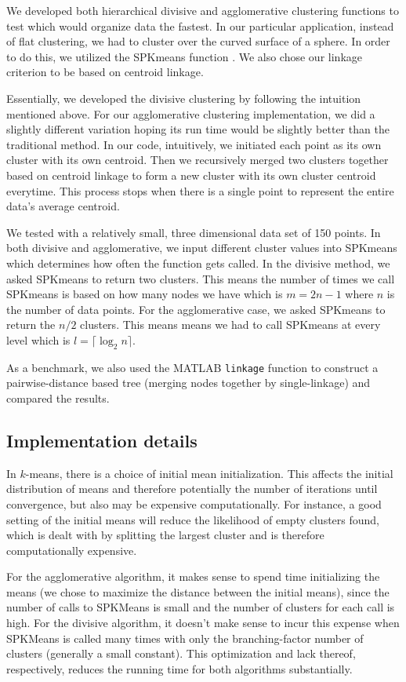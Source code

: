 \documentclass[../tech_report_1.tex]{subfiles}
\begin{document}
We developed both hierarchical divisive and agglomerative clustering
functions to test which would organize data the fastest.
In our particular
application, instead of flat clustering, we had to cluster over the
curved surface of a sphere. In order to do this, we utilized the SPKmeans
function \cite{nguyen_spherical_clustering}. We also chose our linkage criterion
to be based on centroid linkage.

Essentially, we developed the divisive clustering by following the
intuition mentioned above. For our agglomerative clustering implementation,
we did a slightly different variation hoping its run time would be
slightly better than the traditional method. In our code, intuitively,
we initiated each point as its own cluster with its own centroid.
Then we recursively merged two clusters together based on centroid
linkage to form a new cluster with its own cluster centroid everytime.
This process stops when there is a single point to represent the entire
data's average centroid.

We tested with a relatively small,
three dimensional data set of 150 points. In both 
divisive and agglomerative, we input different cluster values into
SPKmeans which determines how often the function gets called. In the
divisive method, we asked SPKmeans to return two clusters.
This means the number of times we call SPKmeans
is based on how many nodes we have which is $m=2n-1$ where $n$ is
the number of data points. For the agglomerative case, we asked SPKmeans to
return the $n/2$ clusters. This means means we had to call SPKmeans
at every level which is $l=\lceil\log_{2}n\rceil$.



As a benchmark, we also used the MATLAB \texttt{linkage} function to construct a pairwise-distance based tree (merging nodes together by single-linkage) and compared the results.

\subsection{Implementation details}\label{hierarchical_clustering_implementation_details}

In $k$-means, there is a choice of initial mean initialization. This affects the initial distribution of means and therefore potentially the number of iterations until convergence, but also may be expensive computationally. For instance, a good setting of the initial means will reduce the likelihood of empty clusters found, which is dealt with by splitting the largest cluster and is therefore computationally expensive.

For the agglomerative algorithm, it makes sense to spend time initializing the means (we chose to maximize the distance between the initial means), since the number of calls to SPKMeans is small and the number of clusters for each call is high. For the divisive algorithm, it doesn't make sense to incur this expense when SPKMeans is called many times with only the branching-factor number of clusters (generally a small constant). This optimization and lack thereof, respectively, reduces the running time for both algorithms substantially.
\end{document}

